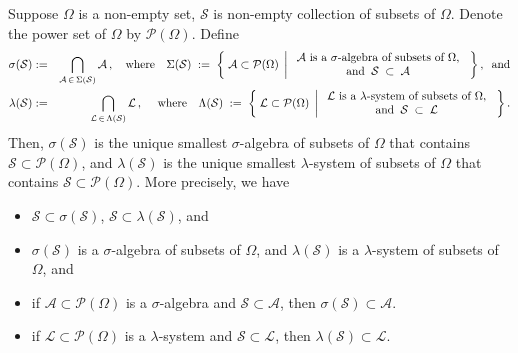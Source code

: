 \begin{theorem}\label{GeneratedSigmaAlgebraLambdaSystem}
\quad
Suppose $\Omega$ is a non-empty set, $\mathcal{S}$ is non-empty collection of subsets of $\Omega$.
Denote the power set of $\Omega$ by $\mathcal{P}(\Omega)$.
Define
\begin{eqnarray*}
\sigma\!\left(\mathcal{S}\right)
& := &
\bigcap_{\mathcal{A}\,\in\,\Sigma(\mathcal{S})}\mathcal{A}\,,
\quad\textnormal{where}\quad
\Sigma(\mathcal{S})
\; := \;
\left\{\;
\mathcal{A} \subset \mathcal{P}(\Omega)
\;\left\vert\;
\begin{array}{c}
	\textnormal{$\mathcal{A}$ is a $\sigma$-algebra of subsets of $\Omega$,}
	\\
	\textnormal{and}\;\;\mathcal{S} \; \subset \; \mathcal{A}
\end{array}
\right.
\;\right\}, \;\;\textnormal{and}
\\
\lambda\!\left(\mathcal{S}\right)
& := &
\bigcap_{\mathcal{L}\,\in\,\Lambda(\mathcal{S})}\mathcal{L}\,,
\quad\;\textnormal{where}\quad
\Lambda(\mathcal{S})
\; := \;
\left\{\;
\mathcal{L} \subset \mathcal{P}(\Omega)
\;\left\vert\;
\begin{array}{c}
	\textnormal{$\mathcal{L}$ is a $\lambda$-system of subsets of $\Omega$,}
	\\
	\textnormal{and}\;\;\mathcal{S} \; \subset \; \mathcal{L}
\end{array}
\right.
\;\right\}.
\end{eqnarray*}
Then,
$\sigma\!\left(\mathcal{S}\right)$ is the unique smallest $\sigma$-algebra of subsets of $\Omega$
that contains $\mathcal{S} \subset \mathcal{P}(\Omega)$, and 
$\lambda\!\left(\mathcal{S}\right)$ is the unique smallest $\lambda$-system of subsets of $\Omega$
that contains $\mathcal{S} \subset \mathcal{P}(\Omega)$.
More precisely, we have
\begin{itemize}
\item	$\mathcal{S} \subset \sigma\!\left(\mathcal{S}\right)$, $\mathcal{S} \subset \lambda\!\left(\mathcal{S}\right)$, and
\item	$\sigma\!\left(\mathcal{S}\right)$ is a $\sigma$-algebra of subsets of $\Omega$, and
		$\lambda\!\left(\mathcal{S}\right)$ is a $\lambda$-system of subsets of $\Omega$, and
\item	if $\mathcal{A} \subset \mathcal{P}(\Omega)$ is a $\sigma$-algebra and $\mathcal{S} \subset \mathcal{A}$,
		then $\sigma\!\left(\mathcal{S}\right) \subset \mathcal{A}$.
\item	if $\mathcal{L} \subset \mathcal{P}(\Omega)$ is a $\lambda$-system and $\mathcal{S} \subset \mathcal{L}$,
		then $\lambda\!\left(\mathcal{S}\right) \subset \mathcal{L}$.
\end{itemize}
\end{theorem}
